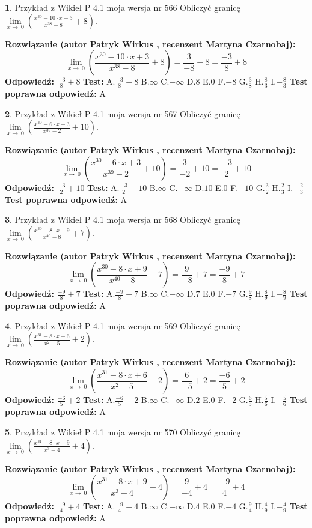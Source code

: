\documentclass[12pt, a4paper]{article}
\theoremstyle{definition} %
\newtheorem{zad}{}
\newcommand{\zadStart}[1]{\begin{zad}#1\newline}
\newcommand{\zadStop}{\end{zad}}
\newcommand{\rozwStart}[2]{\noindent \textbf{Rozwiązanie (autor #1 , recenzent #2): }\newline}
\newcommand{\rozwStop}{\newline}
\newcommand{\odpStart}{\noindent \textbf{Odpowiedź:}\newline}
\newcommand{\odpStop}{\newline}
\newcommand{\testStart}{\noindent \textbf{Test:}\newline}
\newcommand{\testStop}{\newline}
\newcommand{\kluczStart}{\noindent \textbf{Test poprawna odpowiedź:}\newline}
\newcommand{\kluczStop}{\newline}
\begin{document}
\zadStart{Przykład z Wikieł P 4.1 moja wersja nr 566}
Obliczyć granicę $\lim\limits_{x\to\ 0}(\frac{x^{30}-10 \cdot x +3}{x^{38}-8}+8)$.
\zadStop
\rozwStart{Patryk Wirkus}{Martyna Czarnobaj}
$$\lim\limits_{x\to\ 0}(\frac{x^{30}-10 \cdot x +3}{x^{38}-8}+8)=\frac{3}{-8}+8=\frac{-3}{8}+8$$
\rozwStop
\odpStart
$\frac{-3}{8}+8$
\odpStop
\testStart
A.$\frac{-3}{8}+8$
B.$\infty$
C.$-\infty$
D.$8$
E.$0$
F.$-8$
G.$\frac{3}{8}$
H.$\frac{8}{3}$
I.$-\frac{8}{3}$
\testStop
\kluczStart
A
\kluczStop



\zadStart{Przykład z Wikieł P 4.1 moja wersja nr 567}
Obliczyć granicę $\lim\limits_{x\to\ 0}(\frac{x^{30}-6 \cdot x +3}{x^{39}-2}+10)$.
\zadStop
\rozwStart{Patryk Wirkus}{Martyna Czarnobaj}
$$\lim\limits_{x\to\ 0}(\frac{x^{30}-6 \cdot x +3}{x^{39}-2}+10)=\frac{3}{-2}+10=\frac{-3}{2}+10$$
\rozwStop
\odpStart
$\frac{-3}{2}+10$
\odpStop
\testStart
A.$\frac{-3}{2}+10$
B.$\infty$
C.$-\infty$
D.$10$
E.$0$
F.$-10$
G.$\frac{3}{2}$
H.$\frac{2}{3}$
I.$-\frac{2}{3}$
\testStop
\kluczStart
A
\kluczStop



\zadStart{Przykład z Wikieł P 4.1 moja wersja nr 568}
Obliczyć granicę $\lim\limits_{x\to\ 0}(\frac{x^{30}-8 \cdot x +9}{x^{40}-8}+7)$.
\zadStop
\rozwStart{Patryk Wirkus}{Martyna Czarnobaj}
$$\lim\limits_{x\to\ 0}(\frac{x^{30}-8 \cdot x +9}{x^{40}-8}+7)=\frac{9}{-8}+7=\frac{-9}{8}+7$$
\rozwStop
\odpStart
$\frac{-9}{8}+7$
\odpStop
\testStart
A.$\frac{-9}{8}+7$
B.$\infty$
C.$-\infty$
D.$7$
E.$0$
F.$-7$
G.$\frac{9}{8}$
H.$\frac{8}{9}$
I.$-\frac{8}{9}$
\testStop
\kluczStart
A
\kluczStop



\zadStart{Przykład z Wikieł P 4.1 moja wersja nr 569}
Obliczyć granicę $\lim\limits_{x\to\ 0}(\frac{x^{31}-8 \cdot x +6}{x^{2}-5}+2)$.
\zadStop
\rozwStart{Patryk Wirkus}{Martyna Czarnobaj}
$$\lim\limits_{x\to\ 0}(\frac{x^{31}-8 \cdot x +6}{x^{2}-5}+2)=\frac{6}{-5}+2=\frac{-6}{5}+2$$
\rozwStop
\odpStart
$\frac{-6}{5}+2$
\odpStop
\testStart
A.$\frac{-6}{5}+2$
B.$\infty$
C.$-\infty$
D.$2$
E.$0$
F.$-2$
G.$\frac{6}{5}$
H.$\frac{5}{6}$
I.$-\frac{5}{6}$
\testStop
\kluczStart
A
\kluczStop



\zadStart{Przykład z Wikieł P 4.1 moja wersja nr 570}
Obliczyć granicę $\lim\limits_{x\to\ 0}(\frac{x^{31}-8 \cdot x +9}{x^{3}-4}+4)$.
\zadStop
\rozwStart{Patryk Wirkus}{Martyna Czarnobaj}
$$\lim\limits_{x\to\ 0}(\frac{x^{31}-8 \cdot x +9}{x^{3}-4}+4)=\frac{9}{-4}+4=\frac{-9}{4}+4$$
\rozwStop
\odpStart
$\frac{-9}{4}+4$
\odpStop
\testStart
A.$\frac{-9}{4}+4$
B.$\infty$
C.$-\infty$
D.$4$
E.$0$
F.$-4$
G.$\frac{9}{4}$
H.$\frac{4}{9}$
I.$-\frac{4}{9}$
\testStop
\kluczStart
A
\kluczStop
\end{document}
